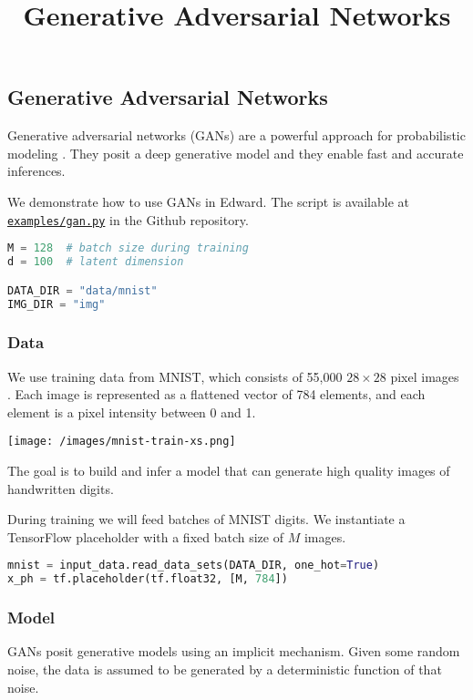 \title{Generative Adversarial Networks}

\subsection{Generative Adversarial Networks}

Generative adversarial networks (GANs) are a powerful approach for
probabilistic modeling \citep{goodfellow2014generative,goodfellow2016nips}.
They posit a deep generative model and they enable fast and accurate
inferences.

We demonstrate how to use GANs in Edward.
The script is available at
\href{https://github.com/blei-lab/edward/blob/master/examples/gan.py}
{\texttt{examples/gan.py}} in the Github repository.

\begin{lstlisting}[language=Python]
M = 128  # batch size during training
d = 100  # latent dimension

DATA_DIR = "data/mnist"
IMG_DIR = "img"
\end{lstlisting}


\subsubsection{Data}

We use training data from MNIST, which consists of 55,000 $28\times
28$ pixel images \citep{lecun1998gradient}. Each image is represented
as a flattened vector of 784 elements, and each element is a pixel
intensity between 0 and 1.

\texttt{[image: /images/mnist-train-xs.png]}

The goal is to build and infer a model that can generate high quality
images of handwritten digits.

During training we will feed batches of MNIST digits. We instantiate a
TensorFlow placeholder with a fixed batch size of $M$ images.

\begin{lstlisting}[language=Python]
mnist = input_data.read_data_sets(DATA_DIR, one_hot=True)
x_ph = tf.placeholder(tf.float32, [M, 784])
\end{lstlisting}


\subsubsection{Model}

GANs posit generative models using an implicit mechanism. Given some
random noise, the data is assumed to be generated by a deterministic
function of that noise.


